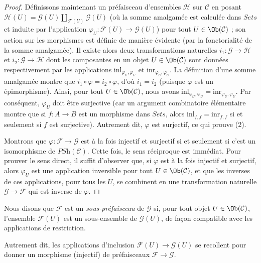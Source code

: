 \begin{proof}
\medskip\noindent
Définissons maintenant un préfaisceau d’ensembles $\mathcal{H}$ sur $\mathcal{C}$
en posant $\mathcal{H}(U)
= \mathcal{G}(U) \coprod_{\mathcal{F}(U)} \mathcal{G}(U)$ (où
la somme amalgamée est calculée dans $\textit{Sets}$ et induite par
l’application $\varphi_U : \mathcal{F}(U) \to \mathcal{G}(U)$) pour
tout $U \in \Ob(\mathcal{C})$ ; son action sur les morphismes est
définie de manière évidente (par la fonctorialité de la somme amalgamée).
Il existe alors deux transformations
naturelles $i_1 : \mathcal{G} \to \mathcal{H}$ et
$i_2 : \mathcal{G} \to \mathcal{H}$ dont les composantes en un objet
$U \in \Ob(\mathcal{C})$ sont données respectivement par les applications
$\text{inl}_{\varphi_U, \varphi_U}$ et
$\text{inr}_{\varphi_U, \varphi_U}$. La
définition d’une somme amalgamée montre que $i_1 \circ \varphi
= i_2 \circ \varphi$, d’où $i_1 = i_2$ (puisque $\varphi$ est un
épimorphisme). Ainsi, pour tout $U \in \Ob(\mathcal{C})$, nous avons
$\text{inl}_{\varphi_U, \varphi_U}
= \text{inr}_{\varphi_U, \varphi_U}$. Par conséquent, $\varphi_U$
doit être surjective (car un argument combinatoire élémentaire montre
que si $f : A \to B$ est un morphisme dans $\textit{Sets}$, alors
$\text{inl}_{f,f} = \text{inr}_{f,f}$ si et
seulement si $f$ est surjective). Autrement dit, $\varphi$ est
surjectif, ce qui prouve (2).

\medskip\noindent
Montrons que $\varphi : \mathcal{F} \to
\mathcal{G}$ est à la fois injectif et surjectif si et seulement si c’est
un isomorphisme de $\textit{PSh}(\mathcal{C})$. Cette fois,
le sens réciproque est immédiat. Pour prouver le sens direct,
il suffit d’observer que, si $\varphi$ est à la fois
injectif et surjectif, alors $\varphi_U$ est une application inversible
pour tout $U \in \Ob(\mathcal{C})$, et que les inverses de ces
applications, pour tous les $U$, se combinent en une transformation naturelle
$\mathcal{G} \to \mathcal{F}$ qui est inverse de $\varphi$.
\end{proof}

\begin{definition}
\label{definition-sub-presheaf}
Nous disons que $\mathcal{F}$ est un {\it sous-préfaisceau} de $\mathcal{G}$
si, pour tout objet $U \in \Ob(\mathcal{C})$, l’ensemble
$\mathcal{F}(U)$ est un sous-ensemble de $\mathcal{G}(U)$, de façon compatible
avec les applications de restriction.
\end{definition}

\noindent
Autrement dit, les applications
d’inclusion $\mathcal{F}(U) \to \mathcal{G}(U)$
se recollent pour donner un morphisme (injectif) de
préfaisceaux $\mathcal{F} \to \mathcal{G}$.

